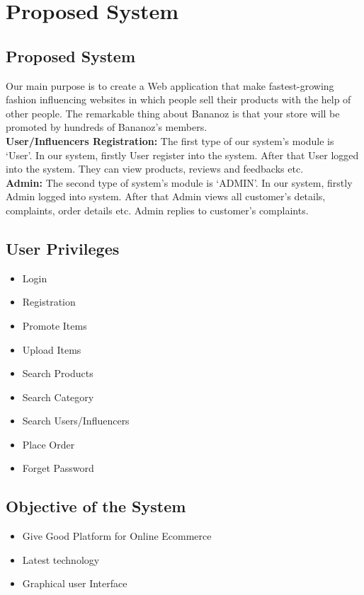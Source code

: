 \chapter{Proposed System}


\section{Proposed System}
Our main purpose is to create a Web application that make fastest-growing fashion influencing websites in which people sell their products with the help of other people. The remarkable thing about Bananoz is that your store will be promoted by hundreds of Bananoz's members.\\
\textbf{User/Influencers Registration:} 
 The first type of our system’s module is ‘User’. In our system, firstly User register into the system. After that User logged into the system. They can view products, reviews and feedbacks etc.\\


\textbf{Admin:}
The second type of system’s module is ‘ADMIN’. In our system, firstly Admin logged into system. After that Admin views all customer’s details, complaints, order details etc. Admin replies to customer’s complaints.\\



\section{User Privileges}

\begin{itemize}
\item Login
\item Registration
\item Promote Items
\item Upload Items
\item Search Products
\item Search Category
\item Search Users/Influencers
\item Place Order
\item Forget Password
\end{itemize}



\section{Objective of the System}

\begin{itemize}
\item Give Good Platform for Online Ecommerce
\item Latest technology 
\item Graphical user Interface
\end{itemize}